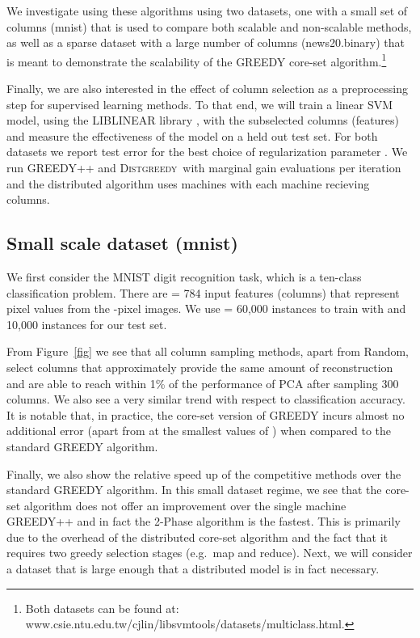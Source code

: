 \documentclass{article}
\newcommand{\distgreedy}{\textsc{Distgreedy}}
\begin{document}
We investigate using these algorithms using two datasets, one with a small
set of columns (mnist) that is used to compare both scalable and
non-scalable methods, as well as a sparse dataset with a large number of
columns (news20.binary) that is meant to demonstrate the scalability of the
GREEDY core-set algorithm.\footnote{Both datasets can be
found at:
www.csie.ntu.edu.tw/cjlin/libsvmtools/datasets/multiclass.html.}

Finally, we are also interested in the effect of column selection as a
preprocessing step for supervised learning methods. To that end, we will train
a linear SVM model, using the LIBLINEAR library \citep{fan2008}, with the
subselected columns (features) and measure the effectiveness of the model on a
held out test set. For both datasets we report test error for the best
choice of regularization parameter .
We run GREEDY++ and \distgreedy\ with 
marginal gain evaluations per iteration and the distributed
algorithm uses  machines with each machine
recieving  columns.


\subsection{Small scale dataset (mnist)}
We first consider the MNIST digit recognition task, which is a
ten-class classification problem. There are  = 784 input features
(columns) that represent pixel values from the -pixel
images. We use  = 60,000 instances to train with and 10,000 instances
for our test set.

From Figure~\ref{fig} we see that all column sampling methods, apart
from Random, select columns that approximately provide the same amount
of reconstruction and are able to reach within 1\% of the performance
of PCA after sampling 300 columns. We also see a very similar trend
with respect to classification accuracy. It is notable that, in
practice, the core-set version of GREEDY incurs almost no additional
error (apart from at the smallest values of ) when compared to the
standard GREEDY algorithm.

Finally, we also show the relative speed up of the competitive methods
over the standard GREEDY algorithm. In this small dataset regime, we
see that the core-set algorithm does not offer an improvement over the single
machine GREEDY++ and in fact the 2-Phase algorithm is the fastest.
This is primarily due to the overhead of the distributed core-set
algorithm and the fact that it requires two greedy selection stages
(e.g.\ map and reduce). Next, we will consider a dataset that is large enough that a distributed model is in fact necessary. 
\end{document}
